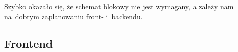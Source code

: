 \documentclass{article}
\begin{document}

Szybko okazało się, że schemat blokowy nie jest wymagany, a zależy nam na~dobrym zaplanowaniu front- i~backendu.
\subsection{Frontend}
\end{document}
